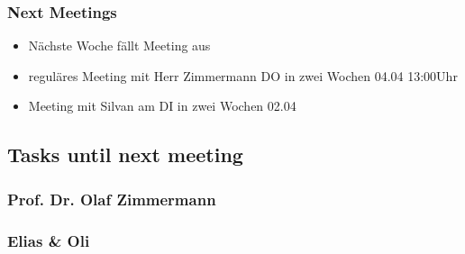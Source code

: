\hypertarget{next-meetings}{%
\subsubsection*{Next Meetings}\label{next-meetings}}

\begin{itemize}
\item Nächste Woche fällt Meeting aus
\item reguläres Meeting mit Herr Zimmermann DO in zwei Wochen 04.04 13:00Uhr
\item Meeting mit Silvan am DI in zwei Wochen 02.04
\end{itemize}

\hypertarget{tasks-until-next-meeting}{%
\subsection*{Tasks until next meeting}\label{tasks-until-next-meeting}}

\hypertarget{prof-dr-olaf-zimmermann}{%
\subsubsection*{Prof. Dr. Olaf Zimmermann}\label{prof-dr-olaf-zimmermann}}

\hypertarget{elias--oli}{%
\subsubsection*{Elias \& Oli}\label{elias--oli}}